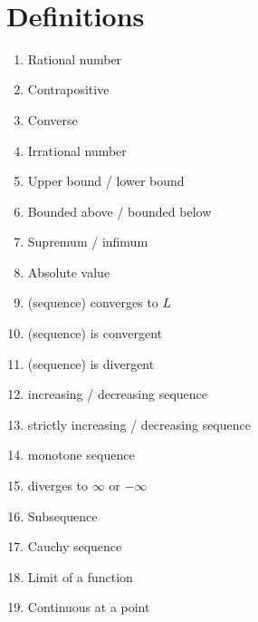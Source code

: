\documentclass[12pt]{amsart}
\begin{document}

\

\section*{Definitions}

\begin{enumerate}
	\item Rational number
	\item Contrapositive
	\item Converse
	\item Irrational number
	\item Upper bound / lower bound
	\item Bounded above / bounded below
	\item Supremum / infimum
	\item Absolute value
	\item (sequence) converges to $L$

	\item (sequence) is convergent
	\item (sequence) is divergent

	\item increasing / decreasing sequence
	\item strictly increasing / decreasing sequence
	\item monotone sequence
	\item diverges to $\infty$ or $-\infty$				
	\item Subsequence
	

	\item Cauchy sequence

	\item Limit of a function

	\item Continuous at a point
				\begin{comment}
	\item Continuous on an open interval
	\item Continuous on a closed interval
	\item Differentiable
	\item Derivative (at a point)
	\item Derivative (function)
	\item Increasing/decreasing function
	\end{comment}
\end{enumerate}
\end{document}
